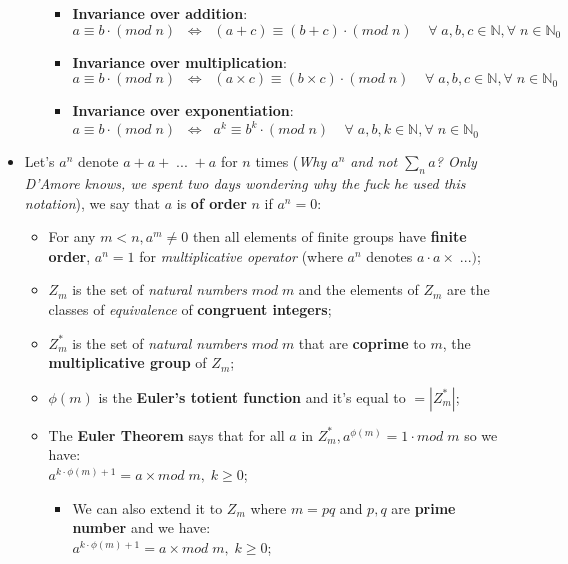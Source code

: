 \documentclass{article}
\begin{document}
\begin{itemize}
\begin{itemize}
\begin{itemize}
\item \textbf{Invariance over addition}:
\\ $a \equiv b \cdot (mod\; n)\;\; \Leftrightarrow \;\; (a+c) \equiv (b+c) \cdot (mod\; n)\; \;\;\;\forall \; a,b,c \in \mathbb{N}, \forall \; n \in \mathbb{N}_0$
\item \textbf{Invariance over multiplication}: 
\\ $a \equiv b \cdot (mod\; n)\;\; \Leftrightarrow \;\; (a\times c) \equiv (b\times c) \cdot (mod\; n)\; \;\;\;\forall \; a,b,c \in \mathbb{N}, \forall \; n \in \mathbb{N}_0$
\item \textbf{Invariance over exponentiation}: 
\\ $a \equiv b \cdot (mod\; n)\;\; \Leftrightarrow \;\; a^k \equiv b^k \cdot (mod\; n)\; \;\;\;\forall \; a,b,k \in \mathbb{N}, \forall \; n \in \mathbb{N}_0$
\end{itemize}
\end{itemize}
\item Let's $a^n$ denote $a + a +\; ... \; +a$ for $n$ times (\emph{Why $a^n$ and not $\sum_{n}a$? Only D'Amore knows, we spent two days wondering why the fuck he used this notation}), we say that $a$ is \textbf{of order} $n$ if $a^n=0$:
\begin{itemize}
\item For any $m<n, a^m \neq 0$ then all elements of finite groups have \textbf{finite order}, $a^n=1$ for \emph{multiplicative operator} (where $a^n$ denotes $a \cdot a\times\;...)$;
\item $Z_m$ is the set of \emph{natural numbers} $mod\; m$ and the elements of $Z_m$ are the classes of \emph{equivalence} of \textbf{congruent integers};
\item $Z_m^{*}$ is the set of \emph{natural numbers} $mod\; m$ that are \textbf{coprime} to $m$, the \textbf{multiplicative group} of $Z_m$;
\item $\phi(m)$ is the \textbf{Euler's totient function} and it's equal to $= |Z_m^{*}|$;
\item The \textbf{Euler Theorem} says that for all $a$ in $Z_m^{*}, a^{\phi(m)} = 1 \cdot mod\; m$ so we have:
\\ $a^{k \cdot \phi (m) + 1} = a\times mod\; m,\; k \geq 0$;
\begin{itemize}
\item We can also extend it to $Z_m$ where $m=pq$ and $p,q$ are \textbf{prime number} and we have:
\\ $a^{k \cdot \phi (m) + 1} = a\times mod\; m,\; k \geq 0$;

\end{itemize}
\end{itemize}
\end{itemize}
\end{document}
